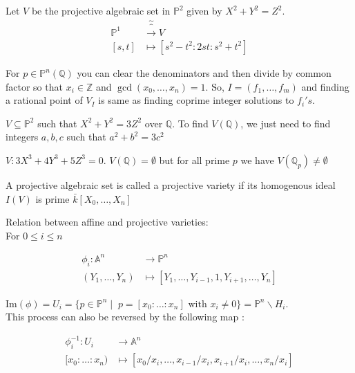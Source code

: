 \documentclass[oneside, 12pt]{scrbook}
\newcommand{\QQ}{\mathbb Q}
\newcommand{\ZZ}{\mathbb Z}
\theoremstyle{theorem}
\begin{document}
\begin{example}
Let $V$ be the projective algebraic set in $\mathbb{P}^2$ given by $X^2 + Y^2 = Z^2$. 
\begin{align*}
\mathbb{P}^1 & \overbrace{\rightarrow}^{\sim} V \\
[s,t] & \mapsto [s^2 - t^2 : 2st : s^2+t^2]
\end{align*}
\end{example}

\begin{remark}
For $p \in \mathbb{P}^n(\QQ)$ you can clear the denominators and then divide by common factor so that $x_{i} \in \ZZ$ and $\gcd(x_{0} , \hdots ,x_{n})=1$. So, $I =(f_{1}, \hdots , f_{m})$ and finding a rational point of $V_{I}$ is same as finding coprime integer solutions to $f_{i}'s$. 
\end{remark}

\begin{example}
$V \subseteq \mathbb{P}^2$ such that $X^2 + Y^2 = 3Z^2$ over $\QQ$. To find $V(\QQ)$, we just need to find integers $a,b,c$ such that $a^2 +b^2 = 3c^2$
\end{example}

\begin{example}
$V : 3X^3 + 4Y^3 + 5Z^3 = 0$. $V(\QQ) = \emptyset$ but for all prime $p$ we have $V(\QQ_{p}) \neq \emptyset$
\end{example}

\begin{definition}
A projective algebraic set is called a projective variety if its homogenous ideal $I(V)$ is prime $\bar{k}[X_{0}, \hdots , X_{n}]$
\end{definition}

Relation between affine and projective varieties: \\

For $ 0 \le i \le n$
\begin{center}
\begin{align*}
\phi_{i}: \mathbb{A}^n &\rightarrow \mathbb{P}^n \\
(Y_{1}, \hdots , Y_{n}) &\mapsto [Y_{1}, \hdots , Y_{i-1}, 1, Y_{i+1} , \hdots , Y_{n}]
\end{align*}
\end{center}
$\mathrm{Im}(\phi) = U_{i} = \{p \in \mathbb{P}^n \mid \; p =[x_{0}: \hdots  : x_{n}] \text{ with } x_{i} \neq 0\} = \mathbb{P}^n \backslash H_{i}$. \\
This process can also be reversed by the following map : 
\begin{center}
\begin{align*}
\phi_{i}^{-1}: U_{i} &\rightarrow \mathbb{A}^n \\
[x_{0}: \hdots : x_{n}) &\mapsto [x_{0}/x_{i}, \hdots , x_{i-1}/x_{i}, x_{i+1}/x_{i} , \hdots , x_{n}/x_{i}]
\end{align*}
\end{center}
\end{document}
